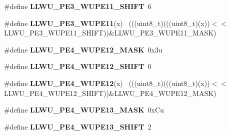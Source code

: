\begin{DoxyCompactItemize}
\item 
\hypertarget{group___l_l_w_u___register___masks_gad8a60b9eab4fe9a0c559bae94033ca1e}{}\#define {\bfseries L\+L\+W\+U\+\_\+\+P\+E3\+\_\+\+W\+U\+P\+E11\+\_\+\+S\+H\+I\+F\+T}~6\label{group___l_l_w_u___register___masks_gad8a60b9eab4fe9a0c559bae94033ca1e}

\item 
\hypertarget{group___l_l_w_u___register___masks_ga04f71e0da1d8aa3f07fcab88cad7fb67}{}\#define {\bfseries L\+L\+W\+U\+\_\+\+P\+E3\+\_\+\+W\+U\+P\+E11}(x)                                          ~(((uint8\+\_\+t)(((uint8\+\_\+t)(x))$<$$<$L\+L\+W\+U\+\_\+\+P\+E3\+\_\+\+W\+U\+P\+E11\+\_\+\+S\+H\+I\+F\+T))\&L\+L\+W\+U\+\_\+\+P\+E3\+\_\+\+W\+U\+P\+E11\+\_\+\+M\+A\+S\+K)\label{group___l_l_w_u___register___masks_ga04f71e0da1d8aa3f07fcab88cad7fb67}

\item 
\hypertarget{group___l_l_w_u___register___masks_ga0d1b6351b58cc9fbf3099dc653754205}{}\#define {\bfseries L\+L\+W\+U\+\_\+\+P\+E4\+\_\+\+W\+U\+P\+E12\+\_\+\+M\+A\+S\+K}~0x3u\label{group___l_l_w_u___register___masks_ga0d1b6351b58cc9fbf3099dc653754205}

\item 
\hypertarget{group___l_l_w_u___register___masks_gaddb0a17347a85705dc2c2975129a7942}{}\#define {\bfseries L\+L\+W\+U\+\_\+\+P\+E4\+\_\+\+W\+U\+P\+E12\+\_\+\+S\+H\+I\+F\+T}~0\label{group___l_l_w_u___register___masks_gaddb0a17347a85705dc2c2975129a7942}

\item 
\hypertarget{group___l_l_w_u___register___masks_ga8e7cffacb80520d478d473836699ca90}{}\#define {\bfseries L\+L\+W\+U\+\_\+\+P\+E4\+\_\+\+W\+U\+P\+E12}(x)                                          ~(((uint8\+\_\+t)(((uint8\+\_\+t)(x))$<$$<$L\+L\+W\+U\+\_\+\+P\+E4\+\_\+\+W\+U\+P\+E12\+\_\+\+S\+H\+I\+F\+T))\&L\+L\+W\+U\+\_\+\+P\+E4\+\_\+\+W\+U\+P\+E12\+\_\+\+M\+A\+S\+K)\label{group___l_l_w_u___register___masks_ga8e7cffacb80520d478d473836699ca90}

\item 
\hypertarget{group___l_l_w_u___register___masks_ga4d9218c37bd27ed586a5e73aa1b20a84}{}\#define {\bfseries L\+L\+W\+U\+\_\+\+P\+E4\+\_\+\+W\+U\+P\+E13\+\_\+\+M\+A\+S\+K}~0x\+Cu\label{group___l_l_w_u___register___masks_ga4d9218c37bd27ed586a5e73aa1b20a84}

\item 
\hypertarget{group___l_l_w_u___register___masks_ga176680468b0cf75fbccc4a8be5d45388}{}\#define {\bfseries L\+L\+W\+U\+\_\+\+P\+E4\+\_\+\+W\+U\+P\+E13\+\_\+\+S\+H\+I\+F\+T}~2\label{group___l_l_w_u___register___masks_ga176680468b0cf75fbccc4a8be5d45388}


\end{DoxyCompactItemize}
